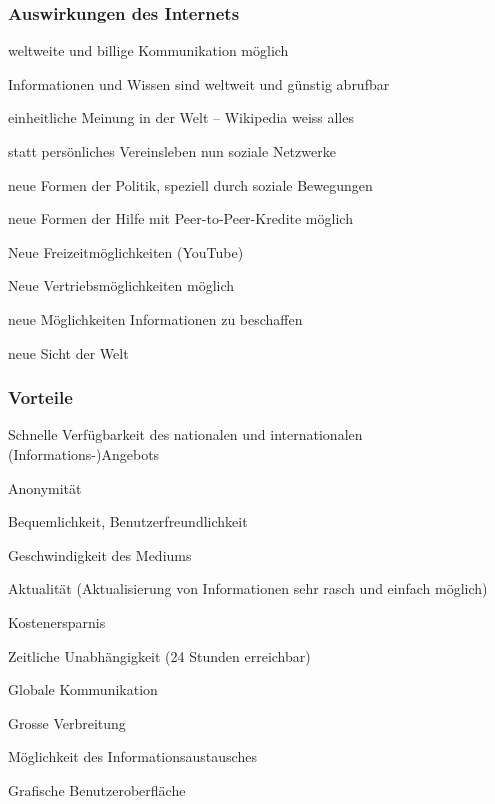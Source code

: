 \documentclass[10pt, openright=true]{scrartcl}
\begin{document}
\subsubsection{Auswirkungen des Internets}
\begin{citemize}
\item weltweite und billige Kommunikation möglich
\item Informationen und Wissen sind weltweit und günstig abrufbar
\item einheitliche Meinung in der Welt – Wikipedia weiss alles
\item statt persönliches Vereinsleben nun soziale Netzwerke
\item neue Formen der Politik, speziell durch soziale Bewegungen
\item neue Formen der Hilfe mit Peer-to-Peer-Kredite möglich
\item Neue Freizeitmöglichkeiten (YouTube)
\item Neue Vertriebsmöglichkeiten möglich
\item neue Möglichkeiten Informationen zu beschaffen
\item neue Sicht der Welt
\end{citemize}
\subsubsection{Vorteile}
\begin{citemize}
\item Schnelle Verfügbarkeit des nationalen und internationalen (Informations-)Angebots
\item Anonymität
\item Bequemlichkeit, Benutzerfreundlichkeit
\item Geschwindigkeit des Mediums
\item Aktualität (Aktualisierung von Informationen sehr rasch und einfach möglich)
\item Kostenersparnis
\item Zeitliche Unabhängigkeit (24 Stunden erreichbar)
\item Globale Kommunikation
\item Grosse Verbreitung
\item Möglichkeit des Informationsaustausches
\item Grafische Benutzeroberfläche
\end{citemize}
\end{document}
